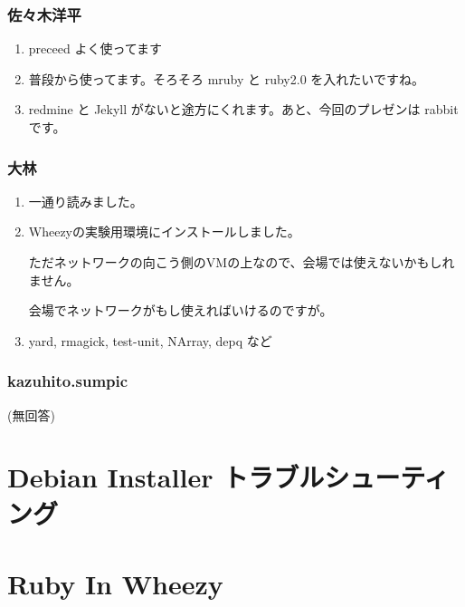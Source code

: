 \documentclass[cjk,dvipdfmx,10pt,compress,%
hyperref={bookmarks=true,bookmarksnumbered=true,bookmarksopen=false,%
colorlinks=false,%
pdftitle={第 69 回 関西 Debian 勉強会},%
pdfauthor={倉敷・のがた・佐々木・かわだ},%
pdfsubject={資料},%
}]{beamer}
\begin{document}
\begin{frame}
  \frametitle{ 佐々木洋平 }
  \begin{enumerate}
  \item preceed よく使ってます
  \item 普段から使ってます。そろそろ mruby と ruby2.0 を入れたいですね。
  \item redmine と Jekyll がないと途方にくれます。あと、今回のプレゼンは rabbit です。
  \end{enumerate}
\end{frame}

\begin{frame}
  \frametitle{ 大林 }
  \begin{enumerate}
  \item 一通り読みました。
  \item Wheezyの実験用環境にインストールしました。

    ただネットワークの向こう側のVMの上なので、会場では使えないかもしれません。

    会場でネットワークがもし使えればいけるのですが。
  \item yard, rmagick, test-unit, NArray, depq など
  \end{enumerate}
\end{frame}

\begin{frame}
  \frametitle{ kazuhito.sumpic }
  (無回答)
\end{frame}


\section{Debian Installer トラブルシューティング}


\section{Ruby In Wheezy}
\end{document}
